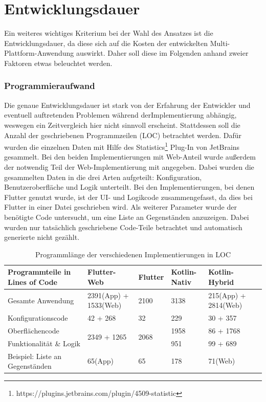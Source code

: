 \section{Entwicklungsdauer}
Ein weiteres wichtiges Kriterium bei der Wahl des Ansatzes ist die Entwicklungsdauer, da diese sich auf die Kosten der entwickelten Multi-Plattform-Anwendung auswirkt. Daher soll diese im Folgenden anhand zweier Faktoren etwas beleuchtet werden.

\subsubsection{Programmieraufwand}
Die genaue Entwicklungsdauer ist stark von der Erfahrung der Entwickler und eventuell auftretenden Problemen während derImplementierung abhängig, weswegen ein Zeitvergleich hier nicht sinnvoll erscheint. Stattdessen soll die Anzahl der geschriebenen Programmzeilen (LOC) betrachtet werden.
Dafür wurden die einzelnen Daten mit Hilfe des Statistics\footnote{https://plugins.jetbrains.com/plugin/4509-statistic} Plug-In von JetBrains gesammelt.
Bei den beiden Implementierungen mit Web-Anteil wurde außerdem der notwendig Teil der Web-Implementierung mit angegeben. 
Dabei wurden die gesammelten Daten in die drei Arten aufgeteilt: Konfiguration, Benutzeroberfläche und Logik unterteilt. 
Bei den Implementierungen, bei denen Flutter genutzt wurde, ist der UI- und Logikcode zusammengefasst, da dies bei Flutter in einer Datei geschrieben wird.
Als weiterer Parameter wurde der benötigte Code untersucht, um eine Liste an Gegenständen anzuzeigen.
Dabei wurden nur tatsächlich geschriebene Code-Teile betrachtet und automatisch generierte nicht gezählt.


\begin{table}
\centering
\caption[Programmlänge der verschiedenen Implementierungen in LOC]{Programmlänge der verschiedenen Implementierungen in LOC}
\begin{tabular}{ |p{4.5cm}||p{3cm}|p{2cm}|p{2cm}|p{3cm}|p{3cm}| }
 \hline
 Programmteile in Lines of Code & Flutter-Web & Flutter & Kotlin-Nativ & Kotlin-Hybrid \\
 \hline
 Gesamte Anwendung       &   2391(App) + 1533(Web) &   2100 & 3138 & 215(App) + 2814(Web)\\
  \hline
 Konfigurationscode  & 42 + 268& 32& 229& 30 + 357\\
  \hline
 Oberflächencode &\multirow{2}{*}{2349 + 1265}  &\multirow{2}{*}{2068}  & 1958& 86 + 1768\\
  \cline{1-1}
  \cline{4 -5}
 Funktionalität \& Logik & & & 951& 99 + 689\\
  \hline
 Beispiel: Liste an Gegenständen & 65(App) & 65 & 178 & 71(Web)\\
  \hline
\end{tabular}
\label{tab:lines_of_code}
\end{table}

